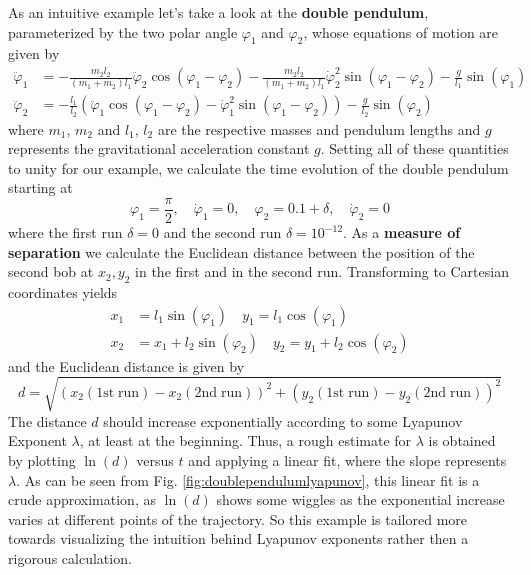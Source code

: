 \documentclass{article}
\begin{document}
As an intuitive example let's take a look at the \textbf{double pendulum}, parameterized by the two polar angle $\varphi_1$ and $\varphi_2$, whose equations of motion are given by
%
\begin{align*}
\ddot{\varphi}_1 &= - \frac{m_2 l_2}{(m_1 + m_2) l_1} \ddot{\varphi}_2 \cos(\varphi_1 - \varphi_2) - \frac{m_2 l_2}{(m_1 + m_2) l_1} \dot{\varphi}_2^2 \sin(\varphi_1 - \varphi_2) - \frac{g}{l_1} \sin(\varphi_1) \\
\ddot{\varphi}_2 &= -\frac{l_1}{l_2} (\ddot{\varphi}_1 \cos(\varphi_1 - \varphi_2) - \dot{\varphi}_1^2 \sin(\varphi_1 - \varphi_2) ) - \frac{g}{l_2} \sin(\varphi_2)
\end{align*}
%
where $m_1$, $m_2$ and $l_1$, $l_2$ are the respective masses and pendulum lengths and $g$ represents the gravitational acceleration constant $g$. Setting all of these quantities to unity for our example, we calculate the time evolution of the double pendulum starting at
%
\begin{equation*}
\varphi_1 = \frac{\pi}{2}, \quad \dot{\varphi}_1 = 0, \quad \varphi_2 = 0.1 + \delta, \quad \dot{\varphi}_2 = 0
\end{equation*}
%
where the first run $\delta = 0$ and the second run $\delta = 10^{-12}$. As a \textbf{measure of separation} we calculate the Euclidean distance between the position of the second bob at $x_2, y_2$ in the first and in the second run. Transforming to Cartesian coordinates yields
%
\begin{align*}
x_1 &= l_1 \sin(\varphi_1) \quad y_1 = l_1 \cos(\varphi_1) \\
x_2 &= x_1 + l_2 \sin(\varphi_2) \quad y_2 = y_1 + l_2 \cos(\varphi_2)
\end{align*}
%
and the Euclidean distance is given by
%
\begin{equation*}
d = \sqrt{(x_2(\mathrm{1st \; run}) - x_2(\mathrm{2nd \; run}))^2 + (y_2(\mathrm{1st \; run}) - y_2(\mathrm{2nd \; run}))^2}
\end{equation*}
%
The distance $d$ should increase exponentially according to some Lyapunov Exponent $\lambda$, at least at the beginning. Thus, a rough estimate for $\lambda$ is obtained by plotting $\ln(d)$ versus $t$ and applying a linear fit, where the slope represents $\lambda$. As can be seen from Fig. \ref{fig:doublependulumlyapunov}, this linear fit is a crude approximation, as $\ln(d)$ shows some wiggles as the exponential increase varies at different points of the trajectory. So this example is tailored more towards visualizing the intuition behind Lyapunov exponents rather then a rigorous calculation. \\
\end{document}
